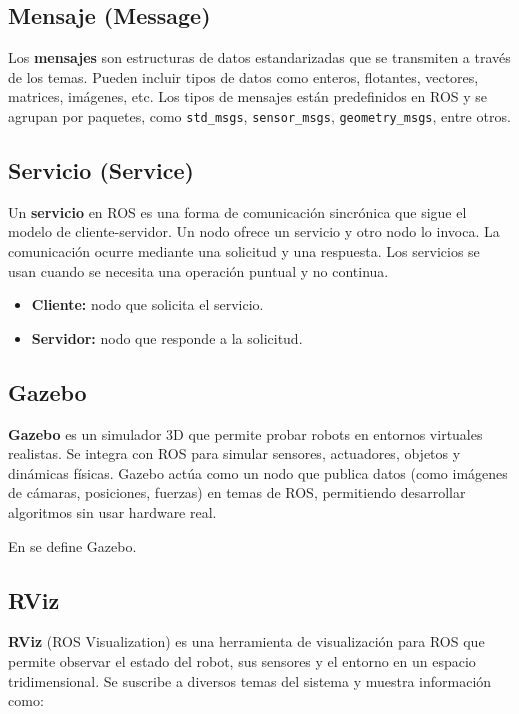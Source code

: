 \subsection{Mensaje (Message)}

Los \textbf{mensajes} son estructuras de datos estandarizadas que se transmiten a través de los temas. Pueden incluir tipos de datos como enteros, flotantes, vectores, matrices, imágenes, etc. Los tipos de mensajes están predefinidos en ROS y se agrupan por paquetes, como \texttt{std\_msgs}, \texttt{sensor\_msgs}, \texttt{geometry\_msgs}, entre otros.


\subsection{Servicio (Service)}

Un \textbf{servicio} en ROS es una forma de comunicación sincrónica que sigue el modelo de cliente-servidor. Un nodo ofrece un servicio y otro nodo lo invoca. La comunicación ocurre mediante una solicitud y una respuesta. Los servicios se usan cuando se necesita una operación puntual y no continua.


\begin{itemize}
	\item \textbf{Cliente:} nodo que solicita el servicio.
	\item \textbf{Servidor:} nodo que responde a la solicitud.
\end{itemize}


\subsection{Gazebo}


\textbf{Gazebo} es un simulador 3D que permite probar robots en entornos virtuales realistas. Se integra con ROS para simular sensores, actuadores, objetos y dinámicas físicas. Gazebo actúa como un nodo que publica datos (como imágenes de cámaras, posiciones, fuerzas) en temas de ROS, permitiendo desarrollar algoritmos sin usar hardware real.

En \cite{gazeboTheConstruct} se define Gazebo.

\subsection{RViz}

\textbf{RViz} (ROS Visualization) es una herramienta de visualización para ROS que permite observar el estado del robot, sus sensores y el entorno en un espacio tridimensional. Se suscribe a diversos temas del sistema y muestra información como:



